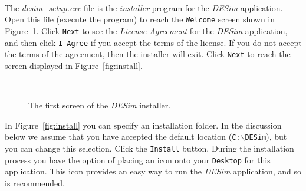 \documentclass[epsfig,10pt,fullpage]{article} \addtolength{\textwidth}{1.5in}
\begin{document}
~\\
\noindent
The {\it desim\_setup.exe} file is the {\it installer} program for the {\it DESim}
application. Open this file (execute the program) to reach the \texttt{Welcome} screen 
shown in Figure~\ref{fig:welcome}. Click \texttt{Next} to see the {\it License Agreement}
for the {\it DESim} application, and then click \texttt{I Agree} if you accept the terms of 
the license. If you do not accept the terms of the agreement, then the installer will
exit. Click \texttt{Next} to reach the screen displayed in Figure~\ref{fig:install}.

~\\
\begin{figure}[h]
	\begin{center}
        \setlength{\fboxsep}{0pt}
	\end{center}
          \caption{The first screen of the {\it DESim} installer.}
	\label{fig:welcome}
\end{figure}

\noindent
In Figure~\ref{fig:install} you can specify an installation folder. In the discussion
below we assume that you have accepted the default location (\texttt{C:$\backslash$DESim}),
but you can change this selection. Click the \texttt{Install} button. 
During the installation process you have the option of placing an icon onto your
\texttt{Desktop} for this application. This icon provides an easy way to run the {\it DESim}
application, and so is recommended. 
\end{document}
